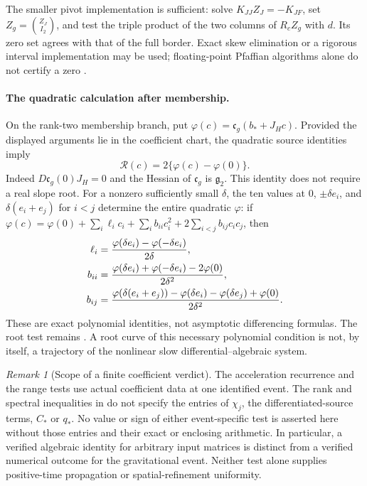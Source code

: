 \documentclass[11pt]{article}
\numberwithin{equation}{section}
\theoremstyle{definition}
\theoremstyle{remark}
\newtheorem{remark}[remark]{Remark}
\begin{document}
The smaller pivot implementation is sufficient: solve
$K_{JJ}Z_J=-K_{JF}$, set $Z_g=\binom{Z_J}{I_2}$,
and test the triple product of the two columns of $R_cZ_g$ with $d$.
Its zero set agrees with that of the full border.  Exact skew elimination
or a rigorous interval implementation may be used; floating-point Pfaffian
algorithms alone do not certify a zero \cite{Wimmer2012}.

\paragraph{The quadratic calculation after membership.}
On the rank-two membership branch, put
$\varphi(c)=\mathfrak c_g(b_*+J_Hc)$.  Provided the displayed arguments lie
in the coefficient chart, the quadratic source identities imply
\begin{equation}
 \mathscr R(c)=2\{\varphi(c)-\varphi(0)\}.
 \label{eq:supp-finite-range-ten-point}
\end{equation}
Indeed $D\mathfrak c_g(0)J_H=0$ and the Hessian of $\mathfrak c_g$ is
$\mathfrak g_2$.  This identity does not require a real slope root.  For a
nonzero sufficiently small $\delta$, the ten values at
$0$, $\pm\delta e_i$, and $\delta(e_i+e_j)$ for $i<j$ determine the entire
quadratic $\varphi$: if
$\varphi(c)=\varphi(0)+\sum_i\ell_ic_i+\sum_i b_{ii}c_i^2+
2\sum_{i<j}b_{ij}c_ic_j$, then
\begin{align}
 \ell_i&=\frac{\varphi(\delta e_i)-\varphi(-\delta e_i)}{2\delta},\notag\\
 b_{ii}&=\frac{\varphi(\delta e_i)+\varphi(-\delta e_i)-2\varphi(0)}{2\delta^2},\notag\\
 b_{ij}&=\frac{\varphi(\delta(e_i+e_j))-\varphi(\delta e_i)
                    -\varphi(\delta e_j)+\varphi(0)}{2\delta^2}.
 \label{eq:supp-finite-range-interpolation}
\end{align}
These are exact polynomial identities, not asymptotic differencing formulas.
The root test remains .  A root curve
of this necessary polynomial condition is not, by itself, a trajectory of
the nonlinear slow differential--algebraic system.

\begin{remark}[Scope of a finite coefficient verdict]
\label{rem:supp-finite-verdict-scope}
The acceleration recurrence and the range tests use actual coefficient data
at one identified event.  The rank and spectral inequalities in
 do not specify the entries of
$\chi_j$, the differentiated-source terms, $C_*$ or $q_*$.  No value or
sign of either event-specific test is asserted here without those entries
and their exact or enclosing arithmetic.  In particular, a verified algebraic
identity for arbitrary input matrices is distinct from a verified numerical
outcome for the gravitational event.  Neither test alone supplies
positive-time propagation or spatial-refinement uniformity.
\end{remark}
\end{document}

